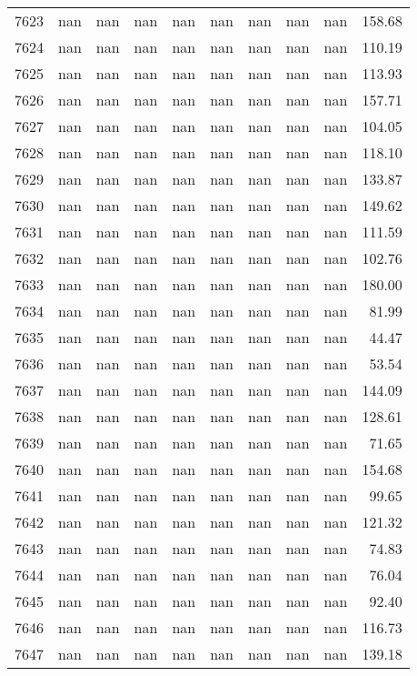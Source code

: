 \begin{tabular}{lrrrrrrrrr}
7623 & nan & nan & nan & nan & nan & nan & nan & nan & 158.68 \\
7624 & nan & nan & nan & nan & nan & nan & nan & nan & 110.19 \\
7625 & nan & nan & nan & nan & nan & nan & nan & nan & 113.93 \\
7626 & nan & nan & nan & nan & nan & nan & nan & nan & 157.71 \\
7627 & nan & nan & nan & nan & nan & nan & nan & nan & 104.05 \\
7628 & nan & nan & nan & nan & nan & nan & nan & nan & 118.10 \\
7629 & nan & nan & nan & nan & nan & nan & nan & nan & 133.87 \\
7630 & nan & nan & nan & nan & nan & nan & nan & nan & 149.62 \\
7631 & nan & nan & nan & nan & nan & nan & nan & nan & 111.59 \\
7632 & nan & nan & nan & nan & nan & nan & nan & nan & 102.76 \\
7633 & nan & nan & nan & nan & nan & nan & nan & nan & 180.00 \\
7634 & nan & nan & nan & nan & nan & nan & nan & nan & 81.99 \\
7635 & nan & nan & nan & nan & nan & nan & nan & nan & 44.47 \\
7636 & nan & nan & nan & nan & nan & nan & nan & nan & 53.54 \\
7637 & nan & nan & nan & nan & nan & nan & nan & nan & 144.09 \\
7638 & nan & nan & nan & nan & nan & nan & nan & nan & 128.61 \\
7639 & nan & nan & nan & nan & nan & nan & nan & nan & 71.65 \\
7640 & nan & nan & nan & nan & nan & nan & nan & nan & 154.68 \\
7641 & nan & nan & nan & nan & nan & nan & nan & nan & 99.65 \\
7642 & nan & nan & nan & nan & nan & nan & nan & nan & 121.32 \\
7643 & nan & nan & nan & nan & nan & nan & nan & nan & 74.83 \\
7644 & nan & nan & nan & nan & nan & nan & nan & nan & 76.04 \\
7645 & nan & nan & nan & nan & nan & nan & nan & nan & 92.40 \\
7646 & nan & nan & nan & nan & nan & nan & nan & nan & 116.73 \\
7647 & nan & nan & nan & nan & nan & nan & nan & nan & 139.18 \\

\end{tabular}
